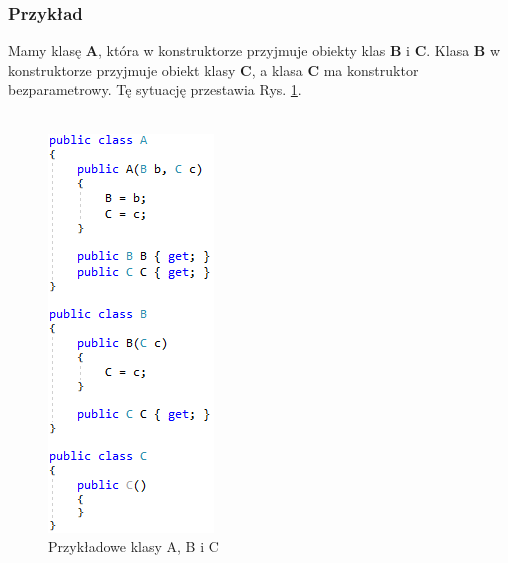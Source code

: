 \documentclass[12pt]{article}
\begin{document}
\subsubsection{Przykład}
Mamy klasę \textbf{A}, która w konstruktorze przyjmuje obiekty klas \textbf{B} i \textbf{C}. Klasa \textbf{B} w konstruktorze przyjmuje obiekt klasy \textbf{C}, a klasa \textbf{C} ma konstruktor bezparametrowy. Tę sytuację przestawia Rys. \ref{fig:Example_Classes}.\\ \\
\begin{figure}[H]
	\begin{center}
  		\includegraphics{Example_Classes.png}
  		\caption{Przykładowe klasy A, B i C}
  		\label{fig:Example_Classes}
	\end{center}
\end{figure}
\end{document}
